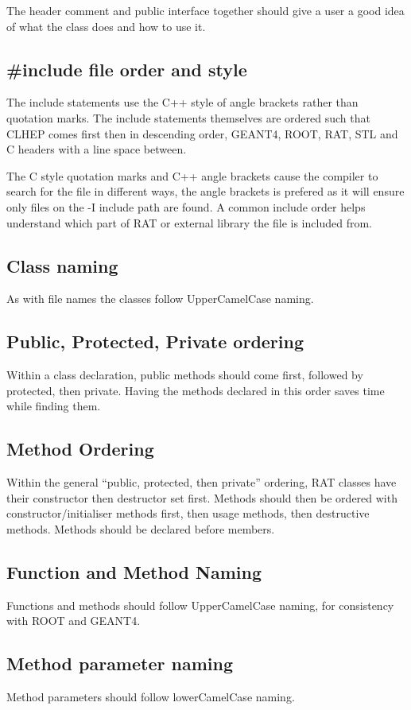 The header comment and public interface together should give a user a good idea of what the class does and how to use it.

\subsection{\#include file order and style}
The include statements use the C++ style of angle brackets rather than quotation marks. The include statements themselves are ordered such that CLHEP comes first then in descending order, GEANT4, ROOT, RAT, STL and C headers with a line space between.

The C style quotation marks and C++ angle brackets cause the compiler to search for the file in different ways, the angle brackets is prefered as it will ensure only files on the -I include path are found. A common include order helps understand which part of RAT or external library the file is included from.

\subsection{Class naming}
As with file names the classes follow UpperCamelCase naming.

\subsection{Public, Protected, Private ordering}
Within a class declaration, public methods should come first, followed by protected, then private. Having the methods declared in this order saves time while finding them.

\subsection{Method Ordering}
Within the general ``public, protected, then private'' ordering, RAT classes have their constructor then destructor set first. Methods should then be ordered with constructor/initialiser methods first, then usage methods, then destructive methods. Methods should be declared before members.

\subsection{Function and Method Naming}
Functions and methods should follow UpperCamelCase naming, for consistency with ROOT and GEANT4.

\subsection{Method parameter naming}
Method parameters should follow lowerCamelCase naming.

